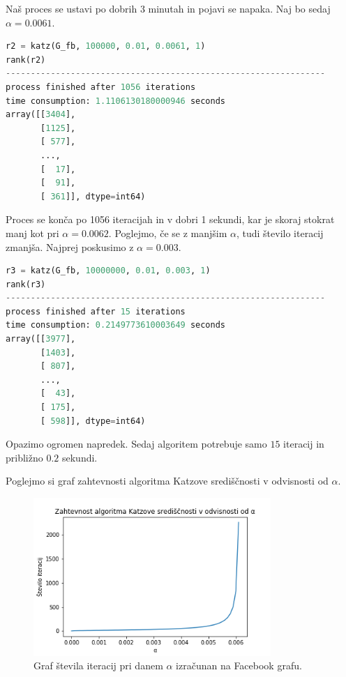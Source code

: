 \documentclass[a4paper]{article}
\begin{document}
Naš proces se ustavi po dobrih 3 minutah in pojavi se napaka. Naj bo sedaj $\alpha = 0.0061.$

\begin{lstlisting}[language=Python]
r2 = katz(G_fb, 100000, 0.01, 0.0061, 1)
rank(r2)
----------------------------------------------------------------
process finished after 1056 iterations
time consumption: 1.1106130180000946 seconds
array([[3404],
       [1125],
       [ 577],
       ...,
       [  17],
       [  91],
       [ 361]], dtype=int64)
\end{lstlisting}

Proces se konča po 1056 iteracijah in v dobri 1 sekundi, kar je skoraj stokrat manj kot pri $\alpha = 0.0062$. Poglejmo, če se z manjšim $\alpha$, tudi število iteracij zmanjša. Najprej poskusimo z $\alpha = 0.003.$

\begin{lstlisting}[language=Python]
r3 = katz(G_fb, 10000000, 0.01, 0.003, 1)
rank(r3)
----------------------------------------------------------------
process finished after 15 iterations
time consumption: 0.2149773610003649 seconds
array([[3977],
       [1403],
       [ 807],
       ...,
       [  43],
       [ 175],
       [ 598]], dtype=int64)
\end{lstlisting}

Opazimo ogromen napredek. Sedaj algoritem potrebuje samo $15$ iteracij in približno $0.2$ sekundi.

Poglejmo si graf zahtevnosti algoritma Katzove središčnosti v odvisnosti od $\alpha.$

\begin{figure}[h]
\begin{center} 
\includegraphics[width=9cm]{Katz_alpha.png}
\caption[Zahtevnost algoritma Katzove središčnosti glede na $\alpha$]{Graf števila iteracij pri danem $\alpha$ izračunan na Facebook grafu.}
\end{center}
\end{figure}
\end{document}
